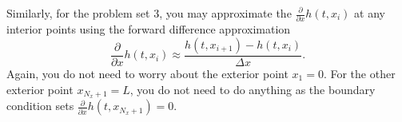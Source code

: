 \documentclass[11pt,a4paper]{article}
\newcommand{\p}{\partial }
\begin{document}
Similarly, for the problem set 3, you may approximate the $\frac{\p }{\p x} h(t, x_i)$ at any interior points using the forward difference approximation
\begin{equation}
\frac{\p }{\p x} h(t, x_i) \approx \frac{h(t, x_{i+1}) - h(t, x_i)}{\Delta x}.
\end{equation}
Again, you do not need to worry about the exterior point $x_1 = 0$. For the other exterior point $x_{N_x + 1} = L$, you do not need to do anything as the boundary condition sets $\frac{\p }{\p x} h(t, x_{N_x + 1}) = 0$. 
\end{document}
